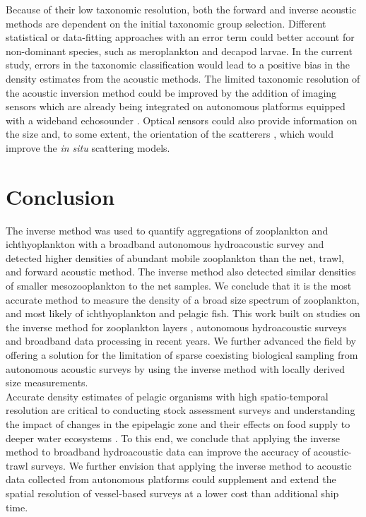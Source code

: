Because of their low taxonomic resolution, both the forward and inverse acoustic methods are dependent on the initial taxonomic group selection. Different statistical or data-fitting approaches with an error term could better account for non-dominant species, such as meroplankton and decapod larvae. In the current study, errors in the taxonomic classification would lead to a positive bias in the density estimates from the acoustic methods. The limited taxonomic resolution of the acoustic inversion method could be improved by the addition of imaging sensors which are already being integrated on autonomous platforms equipped with a wideband echosounder \citep{Whitmore2019, Reiss2021}. Optical sensors could also provide information on the size and, to some extent, the orientation of the scatterers \citep{Ohman2019}, which would improve the \textit{in situ} scattering models.

\section{Conclusion}
The inverse method was used to quantify aggregations of zooplankton and ichthyoplankton with a broadband autonomous hydroacoustic survey and detected higher densities of abundant mobile zooplankton than the net, trawl, and forward acoustic method. The inverse method also detected similar densities of smaller mesozooplankton to the net samples. We conclude that it is the most accurate method to measure the density of a broad size spectrum of zooplankton, and most likely of ichthyoplankton and pelagic fish. This work built on studies on the inverse method for zooplankton layers \citep{Lavery2007}, autonomous hydroacoustic surveys \citep{DeRobertis2019} and broadband data processing \citep{Bassett2019, BenoitBird2020} in recent years. We further advanced the field by offering a solution for the limitation of sparse coexisting biological sampling from autonomous acoustic surveys by using the inverse method with locally derived size measurements.\\
Accurate density estimates of pelagic organisms with high spatio-temporal resolution are critical to conducting stock assessment surveys and understanding the impact of changes in the epipelagic zone and their effects on food supply to deeper water ecosystems \citep{Rogers2015}. To this end, we conclude that applying the inverse method to broadband hydroacoustic data can improve the accuracy of acoustic-trawl surveys. We further envision that applying the inverse method to acoustic data collected from autonomous platforms could supplement and extend the spatial resolution of vessel-based surveys at a lower cost than additional ship time.


